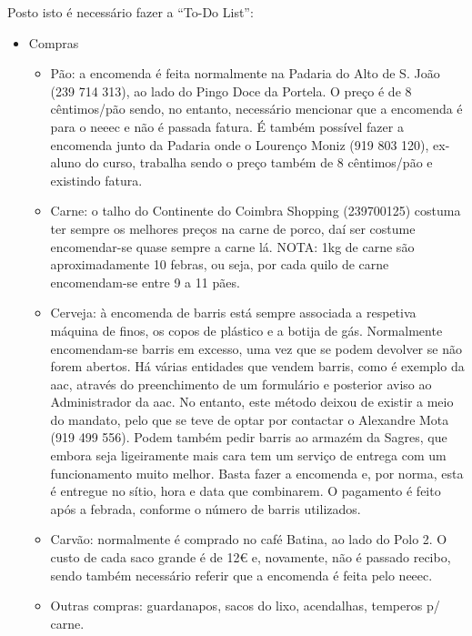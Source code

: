 Posto isto é necessário fazer a “To-Do List”:
\begin{itemize}
    \item Compras
    \begin{itemize}
        \item Pão: a encomenda é feita normalmente na Padaria do Alto de S. João (239 714 313), ao lado do Pingo Doce da Portela. O preço é de 8 cêntimos/pão sendo, no entanto, necessário mencionar que a encomenda é para o \acrshort{neeec} e não é passada fatura. É também possível fazer a encomenda junto da Padaria onde o Lourenço Moniz (919 803 120‬), ex-aluno do curso, trabalha sendo o preço também de 8 cêntimos/pão e existindo fatura.
        \item Carne: o  talho do Continente do Coimbra Shopping (239700125) costuma ter sempre os melhores preços na carne de porco, daí ser costume encomendar-se quase sempre a carne lá. NOTA: 1kg de carne são aproximadamente 10 febras, ou seja, por cada quilo de carne encomendam-se entre 9 a 11 pães.
        \item Cerveja: à encomenda de barris está sempre associada a respetiva máquina de finos, os copos de plástico e a botija de gás. Normalmente encomendam-se barris em excesso, uma vez que se podem devolver se não forem abertos. Há várias entidades que vendem barris, como é exemplo da \acrshort{aac}, através do preenchimento de um formulário e posterior aviso ao Administrador da \acrshort{aac}. No entanto, este método deixou de existir a meio do mandato, pelo que se teve de optar por contactar o Alexandre Mota (919 499 556). Podem também pedir barris ao armazém da Sagres, que embora seja ligeiramente mais cara tem um serviço de entrega com um funcionamento muito melhor. Basta fazer a encomenda e, por norma, esta é entregue no sítio, hora e data que combinarem. O pagamento é feito após a febrada, conforme o número de barris utilizados.
        \item Carvão: normalmente é comprado no café Batina, ao lado do Polo 2. O custo de cada saco grande é de 12€ e, novamente, não é passado recibo, sendo também necessário referir que a encomenda é feita pelo \acrshort{neeec}.
        \item Outras compras: guardanapos, sacos do lixo, acendalhas, temperos p/ carne.
\end{itemize}


\end{itemize}
